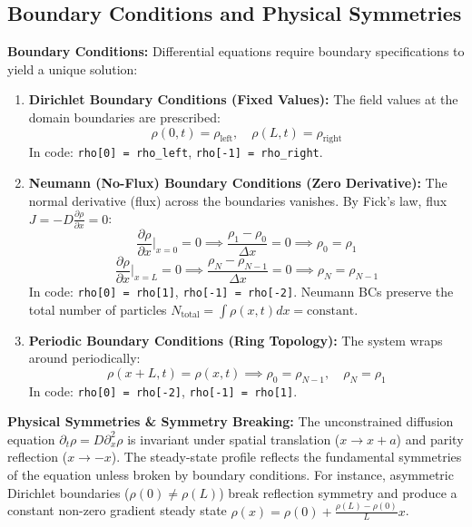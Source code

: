 \documentclass{article}
\begin{document}
\subsection{Boundary Conditions and Physical Symmetries}
\textbf{Boundary Conditions:} Differential equations require boundary specifications to yield a unique solution:
\begin{enumerate}
    \item \textbf{Dirichlet Boundary Conditions (Fixed Values):} The field values at the domain boundaries are prescribed:
    $$\rho(0, t) = \rho_{\text{left}}, \quad \rho(L, t) = \rho_{\text{right}}$$
    In code: \texttt{rho[0] = rho\_left}, \texttt{rho[-1] = rho\_right}.
    
    \item \textbf{Neumann (No-Flux) Boundary Conditions (Zero Derivative):} The normal derivative (flux) across the boundaries vanishes. By Fick's law, flux $J = -D \frac{\partial \rho}{\partial x} = 0$:
    $$\frac{\partial \rho}{\partial x}\bigg|_{x=0} = 0 \implies \frac{\rho_1 - \rho_0}{\Delta x} = 0 \implies \rho_0 = \rho_1$$
    $$\frac{\partial \rho}{\partial x}\bigg|_{x=L} = 0 \implies \frac{\rho_N - \rho_{N-1}}{\Delta x} = 0 \implies \rho_N = \rho_{N-1}$$
    In code: \texttt{rho[0] = rho[1]}, \texttt{rho[-1] = rho[-2]}. Neumann BCs preserve the total number of particles $N_{\text{total}} = \int \rho(x, t) dx = \text{constant}$.
    
    \item \textbf{Periodic Boundary Conditions (Ring Topology):} The system wraps around periodically:
    $$\rho(x + L, t) = \rho(x, t) \implies \rho_0 = \rho_{N-1}, \quad \rho_N = \rho_1$$
    In code: \texttt{rho[0] = rho[-2]}, \texttt{rho[-1] = rho[1]}.
\end{enumerate}

\textbf{Physical Symmetries \& Symmetry Breaking:} 
The unconstrained diffusion equation $\partial_t \rho = D \partial_x^2 \rho$ is invariant under spatial translation ($x \to x + a$) and parity reflection ($x \to -x$). The steady-state profile reflects the fundamental symmetries of the equation unless broken by boundary conditions. For instance, asymmetric Dirichlet boundaries ($\rho(0) \neq \rho(L)$) break reflection symmetry and produce a constant non-zero gradient steady state $\rho(x) = \rho(0) + \frac{\rho(L) - \rho(0)}{L} x$.
\newpage

\end{document}
